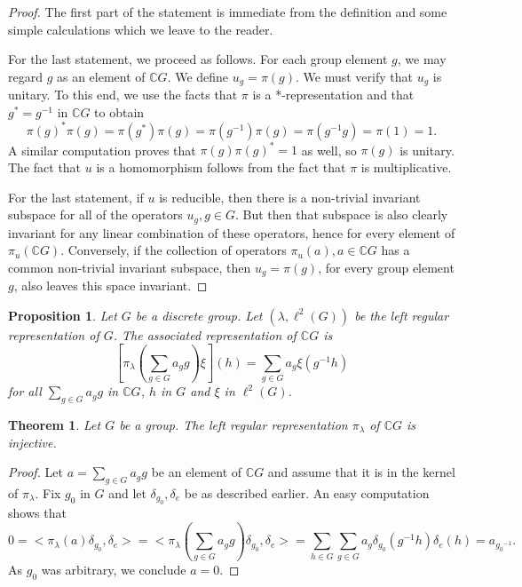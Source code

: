 \documentclass{book}
\newtheorem{proposition}[definition]{Proposition}
\newtheorem{theorem}[definition]{Theorem}
\begin{document}
\begin{proof}
  The first part of the statement is immediate from the definition and
  some simple calculations which we leave to the reader.\par
  For the last statement, we proceed as follows. For each group element \(g\),
  we may regard \(g\) as an element of \(\mathbb{C}G\). We define \(u_g = \pi(g)\). We must verify
  that \(u_g\) is unitary. To this end, we use the facts that \(\pi\) is a *-representation
  and that \(g^* = g^{-1}\) in \(\mathbb{C}G\) to obtain
  \[{\pi(g)}^*\pi(g) = \pi(g^*)\pi(g) = \pi(g^{-1})\pi(g) = \pi(g^{-1}g) = \pi(1) = 1.\]
  A similar computation proves that \(\pi(g){\pi(g)}^* = 1\) as well, so \(\pi(g)\) is 
  unitary. The fact that \(u\) is a homomorphism follows from the fact that \(\pi\) is
  multiplicative.\par
  For the last statement, if \(u\) is reducible, then there is a non-trivial invariant 
  subspace for all of the operators \(u_g,g \in G\). But then that subspace is also
  clearly invariant for any linear combination of these operators, hence for every
  element of \(\pi_u(\mathbb{C}G)\). Conversely, if the collection of operators \(\pi_u(a),a \in \mathbb{C}G\)
  has a common non-trivial invariant subspace, then \(u_g = \pi(g)\), for every group
  element \(g\), also leaves this space invariant.
\end{proof}
\begin{proposition}
  Let \(G\) be a discrete group. Let \((\lambda, \ell^2(G))\) be the left
  regular representation of \(G\). The associated representation of \(\mathbb{C}G\) is
  \[
  \left[ \pi_\lambda \left( \sum_{g\in G}a_g g \right)\xi \right](h)=\sum_{g\in G}a_g\xi (g^{-1}h)
  \]
  for all \(\sum_{g\in G}a_g g\) in \(\mathbb{C}G\), \(h\) in \(G\) and \(\xi\) in \(\ell^2(G)\).
\end{proposition}
\begin{theorem}\label{theorem:225}
  Let \(G\) be a group. The left regular representation \(\pi_\lambda\) of \(\mathbb{C}G\)
  is injective.
\end{theorem}
\begin{proof}
  Let \(a = \sum_{g\in G} a_g g\) be an element of \(\mathbb{C}G\) and assume that it is in the
  kernel of \(\pi_\lambda\). Fix \(g_0\) in \(G\) and let \(\delta_{g_0},\delta_e\) be as described earlier. An easy
  computation shows that
  \[
  0 =<\pi_\lambda(a)\delta_{g_0},\delta_e >=< \pi_\lambda(\sum_{g\in G} a_g g)\delta_{g_0}, \delta_e >
  =\sum_{h\in G}\sum_{g\in G}a_g\delta_{g_0}(g^{-1}h)\delta_e(h) = a_{{g_0}^{-1}}.
  \]
  As \(g_0\) was arbitrary, we conclude \(a = 0\).
\end{proof}
\end{document}
